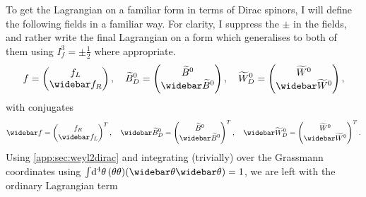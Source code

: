 \documentclass[english, notitlepage]{article}
\begin{document}
            To get the Lagrangian on a familiar form in terms of Dirac spinors, I will define the following fields in a familiar way.
            For clarity, I suppress the \(\pm\) in the fields, and rather write the final Lagrangian on a form which generalises to both of them using \(I^3_f = \pm \frac{1}{2}\) where appropriate.
            \begin{align}
                f = \begin{pmatrix}
                        f_L \\ \wbar{f}_R
                    \end{pmatrix},
                \quad
                \wtilde{B}^0_D = \begin{pmatrix}
                                     \wtilde{B}^0 \\ \wbar{\wtilde{B}}^0
                                 \end{pmatrix},
                \quad
                \wtilde{W}^0_D = \begin{pmatrix}
                                     \wtilde{W}^0 \\ \wbar{\wtilde{W}}^0
                                 \end{pmatrix},
            \end{align}
            with conjugates
            \begin{align}
                \wbar{f} = \begin{pmatrix}
                               f_R \\ \wbar{f}_L
                           \end{pmatrix}^T,
                \quad
                \wbar{\wtilde{B}}^0_D = \begin{pmatrix}
                                            \wtilde{B}^0 \\ \wbar{\wtilde{B}}^0
                                        \end{pmatrix}^T,
                \quad
                \wbar{\wtilde{W}}^0_D = \begin{pmatrix}
                                            \wtilde{W}^0 \\ \wbar{\wtilde{W}}^0
                                        \end{pmatrix}^T.
            \end{align}
            Using \cref{app:sec:weyl2dirac} and integrating (trivially) over the Grassmann coordinates using \(\int \! \mathrm{d}^4 \theta \,(\theta\theta)(\wbar{\theta}\wbar{\theta}) = 1\), we are left with the ordinary Lagrangian term
\end{document}
